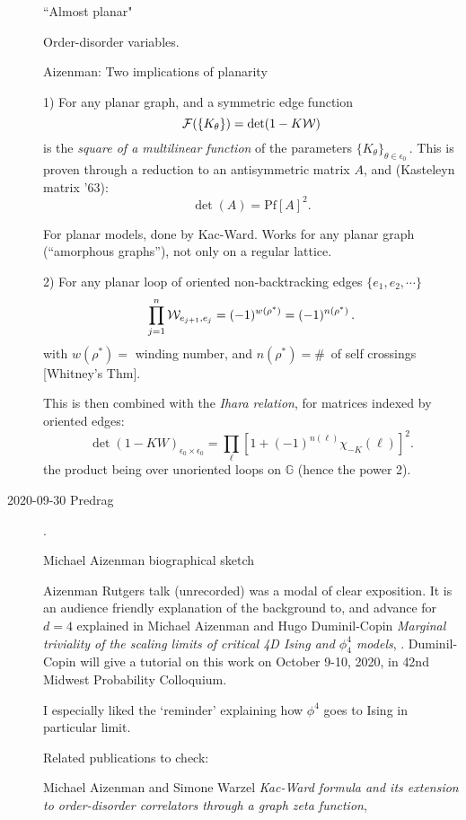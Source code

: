 \begin{description}
{``Almost planar"

Order-disorder variables.

Aizenman: Two implications of planarity

1) For any planar graph, and a symmetric edge function
\[
{\cal F}(\{K_\theta\}) = \det(1-K{\cal W})
\]
is the \emph{square of a multilinear function} of the parameters
\(
\{K_\theta\}_{\theta \in \epsilon_0}
\,.
\)
This is proven through a reduction to an antisymmetric matrix $A$, and
(Kasteleyn matrix '63):
\[
\det (A) = \mbox{Pf}[A]^2.
\]


For planar models, done by Kac-Ward. Works for any planar graph
(``amorphous graphs''), not only on a regular lattice.

2) For any planar loop of oriented non-backtracking edges
\(
\{e_1, e_2, \cdots\}
\)
\[
\prod_{j=1}^n {\cal W}_{e_{j+1},e_j} = (-1)^{w(\rho^*)}
             = (-1)^{n(\rho^*)}
             \,.
\]
with $w(\rho^*) =$ winding number, and $n(\rho^*) = \#$~of {self
crossings } [Whitney's Thm].

This is then combined with the \emph{Ihara relation}, for matrices indexed by
oriented edges:
\[
\det(1- KW)_{\epsilon_0\times\epsilon_0}
= \prod_{\ell}\left[
            1+(-1)^{n(\ell)} \chi_{-K}(\ell)
            \right]^2.
\]
the product being over unoriented loops on $\mathbb{G}$ (hence the power 2).
    }

\item[2020-09-30 Predrag].

 {Michael Aizenman biographical sketch}

Aizenman Rutgers talk (unrecorded) was a modal of clear exposition.
It is an audience
friendly explanation of the background to, and advance for $d=4$
explained in Michael Aizenman and Hugo Duminil-Copin {\em Marginal
triviality of the scaling limits of critical 4D Ising and $\phi_4^4$
models}, . Duminil-Copin will give a tutorial on this
work on October 9-10, 2020, in
{42nd Midwest Probability Colloquium}.

I especially liked the `reminder' explaining how $\phi^4$ goes to Ising in
particular limit.

Related publications to check:

Michael Aizenman and Simone Warzel {\em Kac-Ward formula and its
extension to order-disorder correlators through a graph zeta function},


\end{description}
